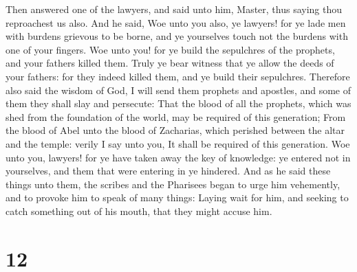  Then answered one of the lawyers, and said unto him,
Master, thus saying thou reproachest us also.  And he said,
Woe unto you also, ye lawyers! for ye lade men with burdens grievous to
be borne, and ye yourselves touch not the burdens with one of your
fingers.  Woe unto you! for ye build the sepulchres of the
prophets, and your fathers killed them.  Truly ye bear
witness that ye allow the deeds of your fathers: for they indeed killed
them, and ye build their sepulchres.  Therefore also said
the wisdom of God, I will send them prophets and apostles, and some of
them they shall slay and persecute:  That the blood of all
the prophets, which was shed from the foundation of the world, may be
required of this generation;  From the blood of Abel unto
the blood of Zacharias, which perished between the altar and the temple:
verily I say unto you, It shall be required of this generation.
 Woe unto you, lawyers! for ye have taken away the key of
knowledge: ye entered not in yourselves, and them that were entering in
ye hindered.  And as he said these things unto them, the
scribes and the Pharisees began to urge him vehemently, and to provoke
him to speak of many things:  Laying wait for him, and
seeking to catch something out of his mouth, that they might accuse him.

\hypertarget{section-11}{%
\section{12}\label{section-11}}

